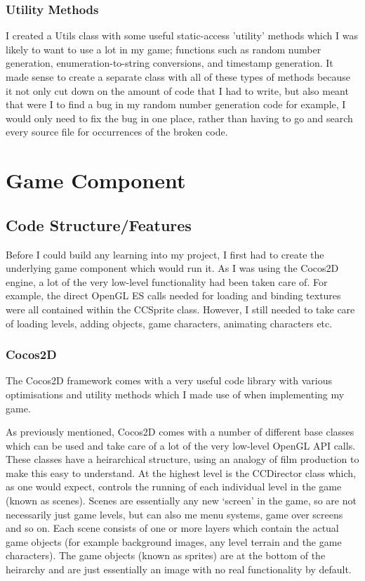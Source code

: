\documentclass[a4paper,oneside]{report}
\begin{document}
\subsection{Utility Methods} 

I created a Utils class with some useful static-access 'utility' methods which I was likely to want to use a lot in my game; functions such as random number generation, enumeration-to-string conversions, and timestamp generation. It made sense to create a separate class with all of these types of methods because it not only cut down on the amount of code that I had to write, but also meant that were I to find a bug in my random number generation code for example, I would only need to fix the bug in one place, rather than having to go and search every source file for occurrences of the broken code. 

\chapter{Game Component}
		
\section{Code Structure/Features}

Before I could build any learning into my project, I first had to create the underlying game component which would run it. As I was using the Cocos2D engine, a lot of the very low-level functionality had been taken care of. For example, the direct OpenGL ES calls needed for loading and binding textures were all contained within the CCSprite class. However, I still needed to take care of loading levels, adding objects, game characters, animating characters etc.

\subsection{Cocos2D} 

The Cocos2D framework comes with a very useful code library with various optimisations and utility methods which I made use of when implementing my game.

As previously mentioned, Cocos2D comes with a number of different base classes which can be used and take care of a lot of the very low-level OpenGL API calls. These classes have a heirarchical structure, using an analogy of film production to make this easy to understand. At the highest level is the CCDirector class which, as one would expect, controls the running of each individual level in the game (known as scenes). Scenes are essentially any new `screen' in the game, so are not necessarily just game levels, but can also me menu systems, game over screens and so on. Each scene consists of one or more layers which contain the actual game objects (for example background images, any level terrain and the game characters). The game objects (known as sprites) are at the bottom of the heirarchy and are just essentially an image with no real functionality by default.
\end{document}

